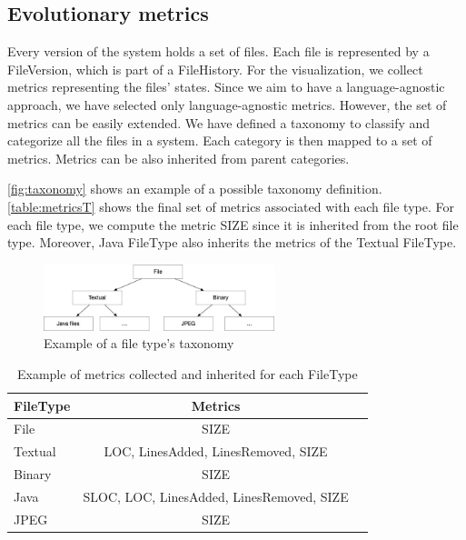 \label{s:evolutionaryMetrics}
\subsection*{Evolutionary metrics}
Every version of the system holds a set of files. 
Each file is represented by a FileVersion, which is part of a FileHistory.
For the visualization, we collect metrics representing the files' states.
Since we aim to have a language-agnostic approach, we have selected only language-agnostic metrics. 
However, the set of metrics can be easily extended.
We have defined a taxonomy to classify and categorize all the files in a system. 
Each category is then mapped to a set of metrics. Metrics can be also inherited from parent categories. 

\autoref{fig:taxonomy} shows an example of a possible taxonomy definition. \autoref{table:metricsT} shows the final set of metrics associated with each file type. For each file type, we compute the metric SIZE since it is inherited from the root file type. Moreover, Java FileType also inherits the metrics of the Textual FileType.  

\begin{figure}[ht]
    \centering
    \includegraphics[width=0.6\textwidth]{Taxonomy.jpg}
    \caption{Example of a file type's taxonomy}
    \label{fig:taxonomy}
\end{figure}

\begin{table}[ht]
    \centering
    \begin{tabular}{lcr} \hline
        {\bf FileType} & {\bf Metrics}\\ \hline
        File    & SIZE      \\
        Textual & LOC, LinesAdded, LinesRemoved, SIZE \\
        Binary  & SIZE         \\
        Java    & SLOC, LOC, LinesAdded, LinesRemoved, SIZE \\
        JPEG    & SIZE \\
    \end{tabular}
    \caption{Example of metrics collected and inherited for each FileType}
    \label{table:metricsT}
\end{table}

